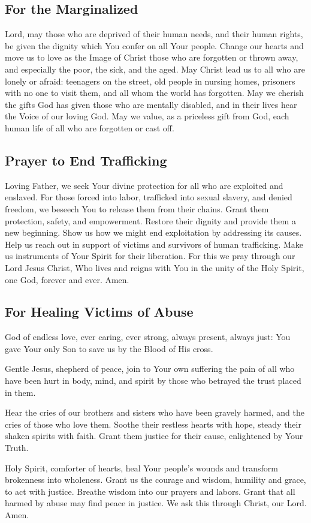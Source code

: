 \documentclass[12pt]{article}
\newcommand{\prayertitle}[1]{\subsection{#1}}
\begin{document}
\prayertitle{For the Marginalized}
\label{prayer:marginalized}
Lord, may those who are deprived of their human needs, and their human rights, be given the dignity which You confer on all Your people.
Change our hearts and move us to love as the Image of Christ those who are forgotten or thrown away, and especially the poor, the sick, and the aged.
May Christ lead us to all who are lonely or afraid: teenagers on the street, old people in nursing homes, prisoners with no one to visit them, and all whom the world has forgotten.
May we cherish the gifts God has given those who are mentally disabled,
and in their lives hear the Voice of our loving God.
May we value, as a priceless gift from God, each human life of all who are forgotten or cast off.

\prayertitle{Prayer to End Trafficking}
\label{prayer:trafficking}
Loving Father, we seek Your divine protection for all who are exploited and enslaved.
For those forced into labor, trafficked into sexual slavery, and denied freedom,
we beseech You to release them from their chains.
Grant them protection, safety, and empowerment.
Restore their dignity and provide them a new beginning.
Show us how we might end exploitation by addressing its causes.
Help us reach out in support of victims and survivors of human trafficking.
Make us instruments of Your Spirit for their liberation.
For this we pray through our Lord Jesus Christ, Who lives and reigns with You in the unity of the Holy Spirit, one God, forever and ever.
Amen.

\prayertitle{For Healing Victims of Abuse}
\label{prayer:healing_victims_abuse}
God of endless love, ever caring, ever strong, always present, always just:
You gave Your only Son to save us by the Blood of His cross.

Gentle Jesus, shepherd of peace, join to Your own suffering the pain of all who have been hurt in body, mind, and spirit by those who betrayed the trust placed in them.

Hear the cries of our brothers and sisters who have been gravely harmed, and the cries of those who love them.
Soothe their restless hearts with hope, steady their shaken spirits with faith.
Grant them justice for their cause, enlightened by Your Truth.

Holy Spirit, comforter of hearts, heal Your people's wounds and transform brokenness into wholeness.
Grant us the courage and wisdom, humility and grace, to act with justice.
Breathe wisdom into our prayers and labors.
Grant that all harmed by abuse may find peace in justice.
We ask this through Christ, our Lord. Amen.
\end{document}
